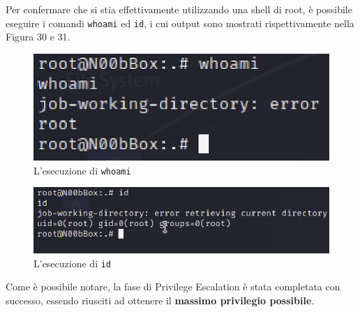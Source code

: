 \documentclass[a4paper, 12pt, oneside]{article}
\begin{document}
Per confermare che si stia effettivamente utilizzando una shell di root, è possibile eseguire i comandi \texttt{whoami} ed \texttt{id}, i cui output sono mostrati rispettivamente nella Figura 30 e 31.

\begin{figure}[h!]
    \centering
    \includegraphics[width=\textwidth]{img/whoami.png}
    \caption{L'esecuzione di \texttt{whoami}}
\end{figure}

\begin{figure}[h!]
    \centering
    \includegraphics[width=\textwidth]{img/id.png}
    \caption{L'esecuzione di \texttt{id}}
\end{figure}

Come è possibile notare, la fase di Privilege Escalation è stata completata con successo, essendo riusciti ad ottenere il \textbf{massimo privilegio possibile}.

\newpage
\printbibliography[title={Riferimenti bibliografici e risorse consultate}]
\end{document}
